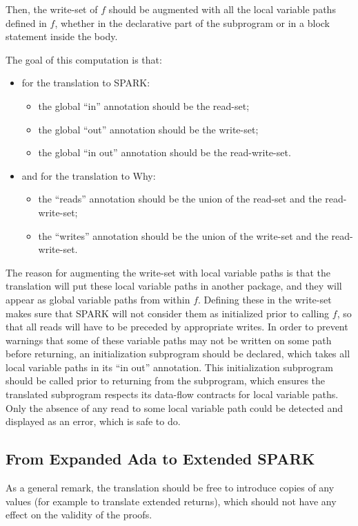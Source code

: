 \documentclass[fullpage]{article}
\newcounter{example}
\begin{document}
Then, the write-set of $f$ should be augmented with all the local variable paths
defined in $f$, whether in the declarative part of the subprogram or in a block
statement inside the body.

The goal of this computation is that:
\begin{itemize}
\item for the translation to SPARK:
\begin{itemize}
\item the global ``in'' annotation should be the read-set;
\item the global ``out'' annotation should be the write-set;
\item the global ``in out'' annotation should be the read-write-set.
\end{itemize}
\item and for the translation to Why:
\begin{itemize}
\item the ``reads'' annotation should be the union of the read-set and the
  read-write-set;
\item the ``writes'' annotation should be the union of the write-set and the
  read-write-set.
\end{itemize}
\end{itemize}

The reason for augmenting the write-set with local variable paths is that the
translation will put these local variable paths in another package, and they
will appear as global variable paths from within $f$. Defining these in the
write-set makes sure that SPARK will not consider them as initialized prior to
calling $f$, so that all reads will have to be preceded by appropriate
writes. In order to prevent warnings that some of these variable paths may not
be written on some path before returning, an initialization subprogram should
be declared, which takes all local variable paths in its ``in out''
annotation. This initialization subprogram should be called prior to returning
from the subprogram, which ensures the translated subprogram respects its
data-flow contracts for local variable paths. Only the absence of any read to
some local variable path could be detected and displayed as an error, which is
safe to do.

\subsection{From Expanded Ada to Extended SPARK}

As a general remark, the translation should be free to introduce copies of any
values (for example to translate extended returns), which should not have any
effect on the validity of the proofs.
\end{document}
